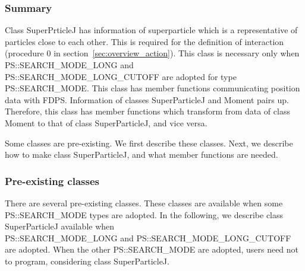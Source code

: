 \subsubsection{Summary}

Class SuperPrticleJ has information of superparticle which is a
representative of particles close to each other. This is required for
the definition of interaction (procedure 0 in
section~\ref{sec:overview_action}). This class is necessary only when
PS::SEARCH\_MODE\_LONG and \\ PS::SEARCH\_MODE\_LONG\_CUTOFF are
adopted for type PS::SEARCH\_MODE. This class has member functions
communicating position data with FDPS. Information of classes
SuperParticleJ and Moment pairs up. Therefore, this class has member
functions which transform from data of class Moment to that of class
SuperParticleJ, and vice versa.

Some classes are pre-existing. We first describe these classes. Next,
we describe how to make class SuperParticleJ, and what member
functions are needed.

\subsubsection{Pre-existing classes}

There are several pre-existing classes. These classes are available
when some PS::SEARCH\_MODE types are adopted. In the following, we
describe class SuperParticleJ available when \\ PS::SEARCH\_MODE\_LONG
and PS::SEARCH\_MODE\_LONG\_CUTOFF are adopted. When the other
PS::SEARCH\_MODE are adopted, users need not to program, considering
class SuperParticleJ.

